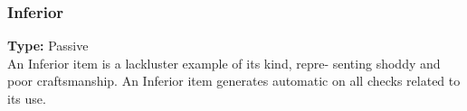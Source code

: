 \subsubsection{Inferior}
\label{iqty:inferior}
\textbf{Type:} Passive\\
An Inferior item is a lackluster example of its kind, repre-
senting shoddy and poor craftsmanship. An Inferior item
generates automatic \threat on all checks related to its use.
